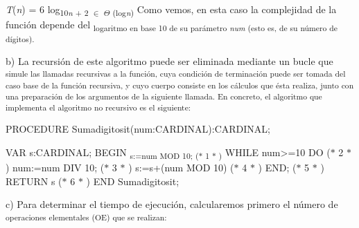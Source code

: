 \documentclass[12pt]{article}
\renewcommand{\_}{\kern-1.5pt\textunderscore\kern-1.5pt}
\begin{document}
\begin{adjustwidth}{0.77in}{0.57in}
\begin{Center}
{\fontsize{10pt}{12.0pt}\selectfont \textit{T}(\textit{n}) = 6 log\textsubscript{10\textit{n }+ 2 $ \in $  $ \Theta $ (log\textit{n}) }Como vemos, en esta caso la complejidad de la función depende del \textsubscript{logaritmo en base 10 de su parámetro \textit{num }(esto es, de su número de dígitos). }\par}
\end{Center}\par

\end{adjustwidth}

\begin{adjustwidth}{0.58in}{0.57in}
{\fontsize{10pt}{12.0pt}\selectfont b) La recursión de este algoritmo puede ser eliminada mediante un bucle que \textsubscript{simule las llamadas recursivas a la función, cuya condición de terminación puede ser tomada del caso base de la función recursiva, y cuyo cuerpo consiste en los cálculos que ésta realiza, junto con una preparación de los argumentos de la siguiente llamada. En concreto, el algoritmo que implementa el algoritmo no recursivo es el siguiente: }\par}\par

\end{adjustwidth}

\begin{adjustwidth}{1.46in}{1.32in}
{\fontsize{10pt}{12.0pt}\selectfont PROCEDURE Sumadigitos\_it(num:CARDINAL):CARDINAL; \par}\par

\end{adjustwidth}

\begin{adjustwidth}{1.46in}{1.44in}
{\fontsize{10pt}{12.0pt}\selectfont VAR s:CARDINAL; BEGIN \textsubscript{s:=num MOD 10; ($\ast$  1 $\ast$ ) }WHILE num>=10 DO ($\ast$  2 $\ast$ ) num:=num DIV 10; ($\ast$  3 $\ast$ ) s:=s+(num MOD 10) ($\ast$  4 $\ast$ ) END; ($\ast$  5 $\ast$ ) RETURN s ($\ast$  6 $\ast$ ) END Sumadigitos\_it; \par}\par

\end{adjustwidth}

\begin{adjustwidth}{0.58in}{0.57in}
{\fontsize{10pt}{12.0pt}\selectfont c) Para determinar el tiempo de ejecución, calcularemos primero el número de \textsubscript{operaciones elementales (OE) que se realizan: }\par}\par

\end{adjustwidth}


\vspace{\baselineskip}

\printbibliography
\end{document}
